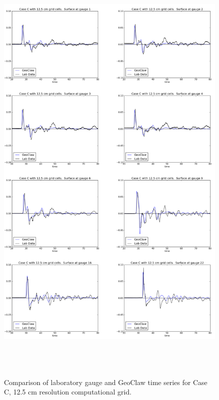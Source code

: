 \begin{figure}[ht]
\hfil\includegraphics[height=8.5in]{bp6/C12-5Gages.png}\hfil
\caption{\label{C12-5Gages}
Comparison of laboratory gauge and GeoClaw time series for Case C, 12.5 cm resolution computational grid.
  }
\end{figure}


